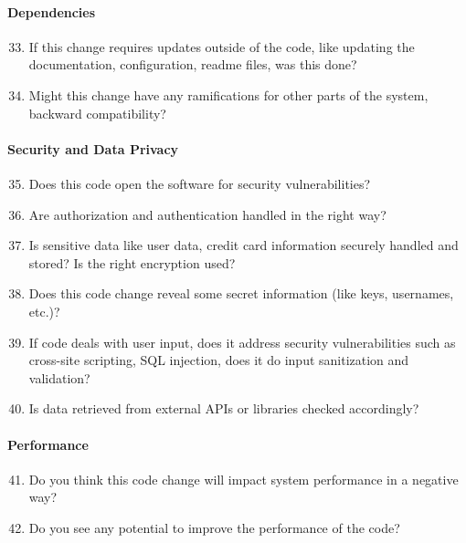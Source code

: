 \paragraph{Dependencies} 
\begin{enumerate}[nosep]
 \setcounter{enumi}{32}
  \item If this change requires updates outside of the code, like updating the documentation, configuration, readme files, was this done?
  \item Might this change have any ramifications for other parts of the system, backward compatibility?
\end{enumerate}

\paragraph{Security and Data Privacy}
\begin{enumerate}[nosep]
 \setcounter{enumi}{34}
  \item Does this code open the software for security vulnerabilities?
  \item Are authorization and authentication handled in the right way?
  \item Is sensitive data like user data, credit card information securely handled and stored? Is the right encryption used?
  \item Does this code change reveal some secret information (like keys, usernames, etc.)?
  \item If code deals with user input, does it address security vulnerabilities such as cross-site scripting, SQL injection, does it do input sanitization and validation?
  \item Is data retrieved from external APIs or libraries checked accordingly?
\end{enumerate}

\paragraph{Performance}
\begin{enumerate}[nosep]
 \setcounter{enumi}{40}
  \item Do you think this code change will impact system performance in a negative way?
  \item Do you see any potential to improve the performance of the code?
  \end{enumerate}
	
